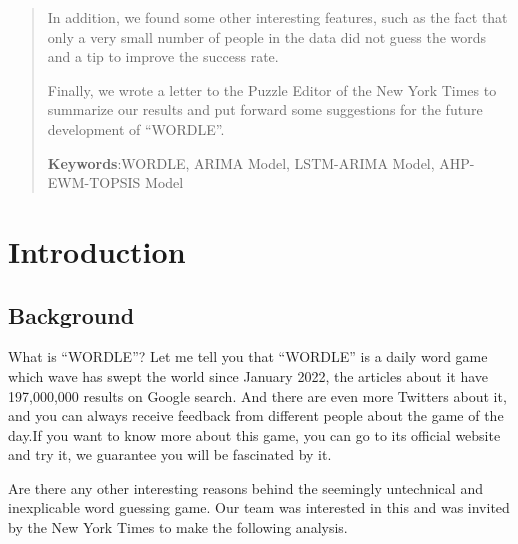 \documentclass[12pt]{article}  %
\begin{document}
\begin{abstract}
In addition, we found some other interesting features, such as the fact that only a very small number of people in the data did not guess the words and a tip to improve the success rate.

Finally, we wrote a letter to the Puzzle Editor of the New York Times to summarize our results and put forward some suggestions for the future development of ``WORDLE''.

    \vspace{5pt}
    \textbf{Keywords}:WORDLE, ARIMA Model, LSTM-ARIMA Model, AHP-EWM-TOPSIS Model    

\end{abstract}

\maketitle 
\tableofcontents
\section{Introduction}
\subsection{Background}
What is ``WORDLE''? Let me tell you that ``WORDLE'' is a daily word game which wave has swept the world since January 2022, the articles about it have 197,000,000 results on Google search. And there are even more Twitters about it, and you can always receive feedback from different people about the game of the day.If you want to know more about this game, you can go to its official website and try it, we guarantee you will be fascinated by it.

Are there any other interesting reasons behind the seemingly untechnical and inexplicable word guessing game. Our team was interested in this and was invited by the New York Times to make the following analysis.
\end{document}
